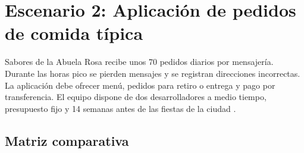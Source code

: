 \documentclass[11pt,a4paper]{article}
\begin{document}
\section{Escenario 2: Aplicación de pedidos de comida típica}

Sabores de la Abuela Rosa recibe unos 70 pedidos diarios por mensajería. Durante las horas pico se pierden mensajes y se registran direcciones incorrectas. La aplicación debe ofrecer menú, pedidos para retiro o entrega y pago por transferencia. El equipo dispone de dos desarrolladores a medio tiempo, presupuesto fijo y 14 semanas antes de las fiestas de la ciudad \cite[sec.~5.2]{materialGA}.

\subsection{Matriz comparativa}
\end{document}
